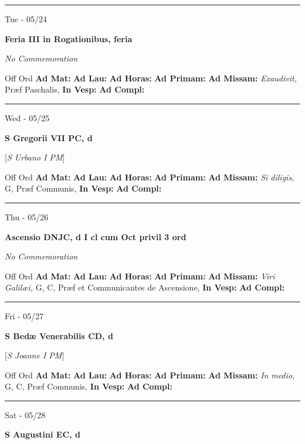 \documentclass[letterpaper, 10pt]{article}
\begin{document}
\hrule
\begin{center}
Tue - 05/24
\end{center}\textbf{ \large Feria III in Rogationibus, \textnormal{\normalsize feria}}

\textit{No Commemoration}\begin{justify}
Off Ord
\textbf{Ad Mat: }
\textbf{Ad Lau: }
\textbf{Ad Horas: }
\textbf{Ad Primam: }
\textbf{Ad Missam:} \textit{Exaudivit, } Præf Paschalis, 
\textbf{In Vesp: }
\textbf{Ad Compl: }\end{justify}



\hrule
\begin{center}
Wed - 05/25
\end{center}\textbf{ \large S Gregorii VII PC, \textnormal{\normalsize d}}

[\textit{S Urbano I PM}]
\begin{justify}
Off Ord
\textbf{Ad Mat: }
\textbf{Ad Lau: }
\textbf{Ad Horas: }
\textbf{Ad Primam: }
\textbf{Ad Missam:} \textit{Si diligis, } G, Præf Communis, 
\textbf{In Vesp: }
\textbf{Ad Compl: }\end{justify}



\hrule
\begin{center}
Thu - 05/26
\end{center}\textbf{ \large Ascensio DNJC, \textnormal{\normalsize d I cl cum Oct privil 3 ord}}

\textit{No Commemoration}\begin{justify}
Off Ord
\textbf{Ad Mat: }
\textbf{Ad Lau: }
\textbf{Ad Horas: }
\textbf{Ad Primam: }
\textbf{Ad Missam:} \textit{Viri Galilæi, } G, C, Præf et Communicantes de Ascensione, 
\textbf{In Vesp: }
\textbf{Ad Compl: }\end{justify}



\hrule
\begin{center}
Fri - 05/27
\end{center}\textbf{ \large S Bedæ Venerabilis CD, \textnormal{\normalsize d}}

[\textit{S Joanne I PM}]
\begin{justify}
Off Ord
\textbf{Ad Mat: }
\textbf{Ad Lau: }
\textbf{Ad Horas: }
\textbf{Ad Primam: }
\textbf{Ad Missam:} \textit{In medio, } G, C, Præf Communis, 
\textbf{In Vesp: }
\textbf{Ad Compl: }\end{justify}



\hrule
\begin{center}
Sat - 05/28
\end{center}\textbf{ \large S Augustini EC, \textnormal{\normalsize d}}
\end{document}
